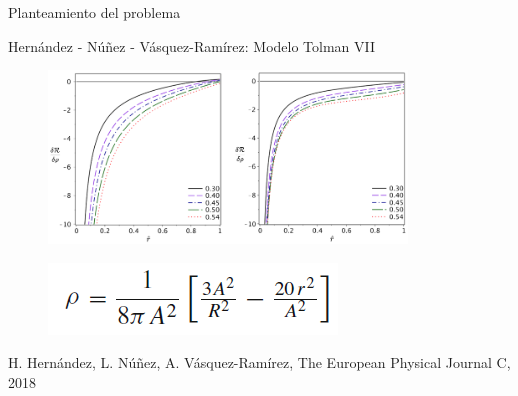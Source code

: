 \documentclass[handout,t]{beamer}
\begin{document}
\begin{frame}{Planteamiento del problema}

\vspace{-4mm}

\centering Hernández - Núñez - Vásquez-Ramírez: Modelo Tolman VII

\begin{figure}[h]
\includegraphics[width=0.85\textwidth]{FracturasConv1.png}
\end{figure}

\vspace{-8mm}

\begin{figure}[h]
\includegraphics[width=.36\textwidth]{TolmanVII.png}
\end{figure}

\tiny H. Hernández, L. Núñez, A. Vásquez-Ramírez, The European Physical Journal C, 2018

\end{frame}
\end{document}
